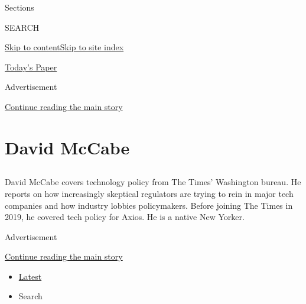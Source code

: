 Sections

SEARCH

\protect\hyperlink{site-content}{Skip to
content}\protect\hyperlink{site-index}{Skip to site index}

\href{https://myaccount.nytimes3xbfgragh.onion/auth/login?response_type=cookie\&client_id=vi}{}

\href{https://www.nytimes3xbfgragh.onion/section/todayspaper}{Today's
Paper}

Advertisement

\protect\hyperlink{after-top}{Continue reading the main story}

\hypertarget{david-mccabe}{%
\section{David McCabe}\label{david-mccabe}}

\hypertarget{section}{%
\subsection{}\label{section}}

David McCabe covers technology policy from The Times' Washington bureau.
He reports on how increasingly skeptical regulators are trying to rein
in major tech companies and how industry lobbies policymakers. Before
joining The Times in 2019, he covered tech policy for Axios. He is a
native New Yorker.

Advertisement

\protect\hyperlink{after-mid1}{Continue reading the main story}

\begin{itemize}
\tightlist
\item
  \protect\hyperlink{stream-panel}{Latest}
\item
  Search
\end{itemize}

